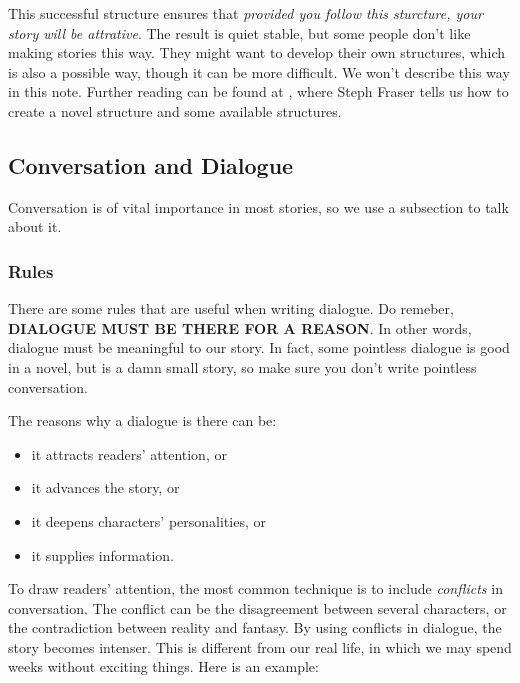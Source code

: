This successful structure ensures that \emph{provided you follow this sturcture, 
your story will be attrative}. The result is quiet stable, but some people don't 
like making stories this way. They might want to develop their own structures, 
which is also a possible way, though it can be more difficult. We won't describe 
this way in this note. Further reading can be found at \cite{StoryStructure}, 
where Steph Fraser tells us how to create a novel structure and some available 
structures.

\subsection{Conversation and Dialogue}
Conversation is of vital importance in most stories, so we use a subsection to 
talk about it. 

\subsubsection{Rules}
There are some rules that are useful when writing dialogue. Do remeber, 
\textbf{DIALOGUE MUST BE THERE FOR A REASON}\@. In other words, dialogue must be 
meaningful to our story. In fact, some pointless dialogue is good in a novel, but 
\DHXX{} is a damn small story, so make sure you don't write pointless 
conversation.

The reasons why a dialogue is there can be:
\begin{itemize}
\item it attracts readers' attention, or
\item it advances the story, or
\item it deepens characters' personalities, or
\item it supplies information.
\end{itemize}

To draw readers' attention, the most common technique is to include 
\emph{conflicts} in conversation. The conflict can be the disagreement between 
several characters, or the contradiction between reality and fantasy. By using 
conflicts in dialogue, the story becomes intenser. This is different from our real 
life, in which we may spend weeks without exciting things. Here is an example:

